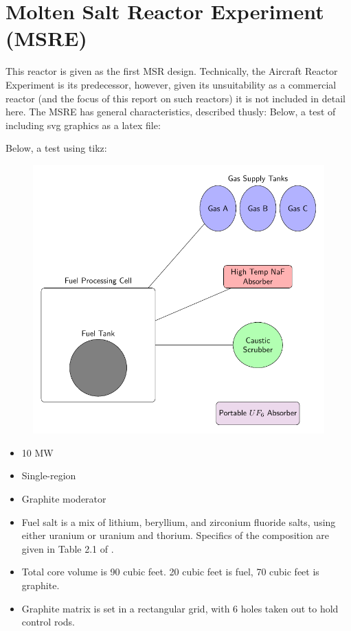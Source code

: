 \documentclass[letterpaper]{article}
\begin{document}
\section{Molten Salt Reactor Experiment (MSRE)}
This reactor is given as the first MSR design.  Technically, the Aircraft Reactor Experiment is its predecessor, however, given its unsuitability as a commercial reactor (and the focus of this report on such reactors) it is not included in detail here.  The MSRE has general characteristics, described thusly: \cite{robertson_msre_1965}
\newpage
Below, a test of including svg graphics as a latex file:
\begin{figure}[H]
  \centering
  
  \label{fig:svg}
  
\end{figure}
\newpage
Below, a test using tikz:
\begin{figure}[H]
  \centering
  \includegraphics[width=1.0\linewidth]{figures/msretik.pdf}
  \label{fig:tikz}
\end{figure}


\begin{itemize}
\item 10 MW
\item Single-region
\item Graphite moderator
\item Fuel salt is a mix of lithium, beryllium, and zirconium fluoride salts, using either uranium or uranium and thorium.  Specifics of the composition are given in Table 2.1 of \cite{robertson_msre_1965}.
\item Total core volume is 90 cubic feet.  20 cubic feet is fuel, 70 cubic feet is graphite.
\item Graphite matrix is set in a rectangular grid, with 6 holes taken out to hold control rods.
\end{itemize}
\end{document}
